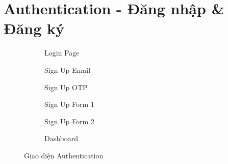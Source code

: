 \section{Authentication - Đăng nhập \& Đăng ký}
\begin{figure}[H]
    \centering
    
    \begin{subfigure}[b]{0.24\textwidth}
        \centering
        \caption{Login Page}
    \end{subfigure}
    \hfill
    \begin{subfigure}[b]{0.24\textwidth}
        \centering
        \caption{Sign Up Email}
    \end{subfigure}
    \hfill
    \begin{subfigure}[b]{0.24\textwidth}
        \centering
        \caption{Sign Up OTP}
    \end{subfigure}
    \hfill
    \begin{subfigure}[b]{0.24\textwidth}
        \centering
        \caption{Sign Up Form 1}
    \end{subfigure}
    
    \vspace{1em}
    
    \begin{subfigure}[b]{0.24\textwidth}
        \centering
        \caption{Sign Up Form 2}
    \end{subfigure}
    \hfill
    \begin{subfigure}[b]{0.24\textwidth}
        \centering
        \caption{Dashboard}
    \end{subfigure}
    \hfill
    \begin{subfigure}[b]{0.24\textwidth}
    \end{subfigure}
    \hfill
    \begin{subfigure}[b]{0.24\textwidth}
    \end{subfigure}
    
    \vspace{1em}
    \caption{Giao diện Authentication}
\end{figure}

